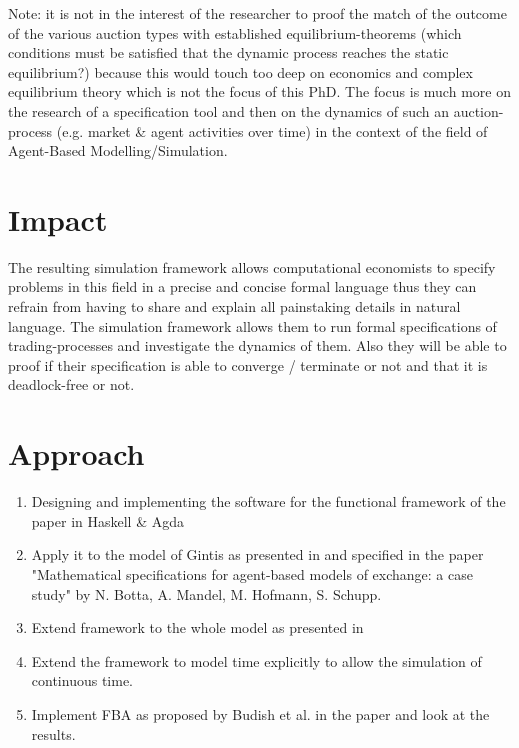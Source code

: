 \documentclass{article}
\begin{document}
\bigskip

Note: it is not in the interest of the researcher to proof the match of the outcome of the various auction types with established equilibrium-theorems (which conditions must be satisfied that the dynamic process reaches the static equilibrium?) because this would touch too deep on economics and complex equilibrium theory which is not the focus of this PhD. The focus is much more on the research of a specification tool and then on the dynamics of such an auction- process (e.g. market \& agent activities over time) in the context of the field of Agent-Based Modelling/Simulation.


\section{Impact}
The resulting simulation framework allows computational economists to specify problems in this field in a precise and concise formal language thus they can refrain from having to share and explain all painstaking details in natural language. The simulation framework allows them to run formal specifications of trading-processes and investigate the dynamics of them. Also they will be able to proof if their specification is able to converge / terminate or not and that it is deadlock-free or not.



\section{Approach}

\begin{enumerate}
\item Designing and implementing the software for the functional framework of the paper \cite{Botta20114025} in Haskell \& Agda
\item Apply it to the model of Gintis as presented in \cite{Gintis2006} and specified in the paper "Mathematical specifications for agent-based models of exchange: a case study" by N. Botta, A. Mandel, M. Hofmann, S. Schupp.
\item Extend framework to the whole model as presented in \cite{gintis_dynamics_2007}
\item Extend the framework to model time explicitly to allow the simulation of continuous time.
\item Implement FBA as proposed by Budish et al. in the paper \cite{Budish2015} and look at the results.
\end{enumerate}
\end{document}
